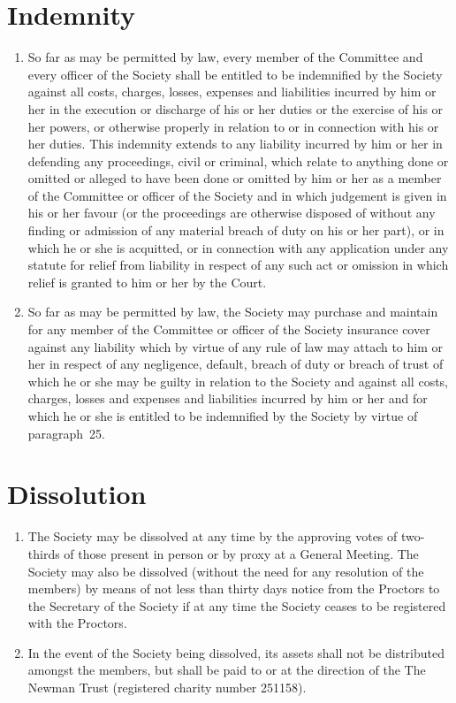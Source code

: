 \documentclass[11pt]{article}
\begin{document}
\section{Indemnity}
\begin{enumerate}
\item So far as may be permitted by law, every member of the Committee and every officer of the Society shall be entitled to be indemnified by the Society against all costs, charges, losses, expenses and liabilities incurred by him or her in the execution or discharge of his or her duties or the exercise of his or her powers, or otherwise properly in relation to or in connection with his or her duties. This indemnity extends to any liability incurred by him or her in defending any proceedings, civil or criminal, which relate to anything done or omitted or alleged to have been done or omitted by him or her as a member of the Committee or officer of the Society and in which judgement is given in his or her favour (or the proceedings are otherwise disposed of without any finding or admission of any material breach of duty on his or her part), or in which he or she is acquitted, or in connection with any application under any statute for relief from liability in respect of any such act or omission in which relief is granted to him or her by the Court.
\item So far as may be permitted by law, the Society may purchase and maintain for any member of the Committee or officer of the Society insurance cover against any liability which by virtue of any rule of law may attach to him or her in respect of any negligence, default, breach of duty or breach of trust of which he or she may be guilty in relation to the Society and against all costs, charges, losses and expenses and liabilities incurred by him or her and for which he or she is entitled to be indemnified by the Society by virtue of paragraph~25.
\end{enumerate}
\section{Dissolution}
\begin{enumerate}
\item The Society may be dissolved at any time by the approving votes of two-thirds of those present in person or by proxy at a General Meeting. The Society may also be dissolved (without the need for any resolution of the members) by means of not less than thirty days notice from the Proctors to the Secretary of the Society if at any time the Society ceases to be registered with the Proctors.
\item In the event of the Society being dissolved, its assets shall not be distributed amongst the members, but shall be paid to or at the direction of the The Newman Trust (registered charity number 251158).
\end{enumerate}
\end{document}
